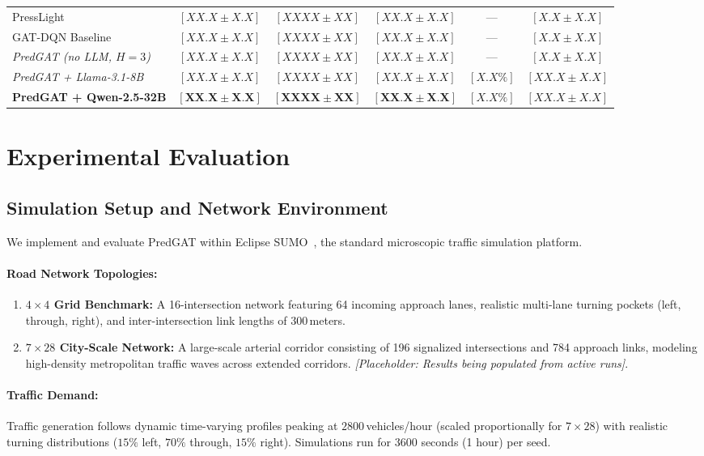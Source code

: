 \documentclass[11pt,a4paper,twocolumn]{article}
\begin{document}
\begin{table}[t]
\begin{tabular}{lccccc}
PressLight~\cite{wei2019presslight} & $[XX.X \pm X.X]$ & $[XXXX \pm XX]$ & $[XX.X \pm X.X]$ & --- & $[X.X \pm X.X]$ \\
GAT-DQN Baseline & $[XX.X \pm X.X]$ & $[XXXX \pm XX]$ & $[XX.X \pm X.X]$ & --- & $[X.X \pm X.X]$ \\
\midrule
\textit{PredGAT (no LLM, $H=3$)} & $[XX.X \pm X.X]$ & $[XXXX \pm XX]$ & $[XX.X \pm X.X]$ & --- & $[X.X \pm X.X]$ \\
\textit{PredGAT + Llama-3.1-8B} & $[XX.X \pm X.X]$ & $[XXXX \pm XX]$ & $[XX.X \pm X.X]$ & $[X.X\%]$ & $[XX.X \pm X.X]$ \\
\textbf{PredGAT + Qwen-2.5-32B} & $[\mathbf{XX.X \pm X.X}]$ & $[\mathbf{XXXX \pm XX}]$ & $[\mathbf{XX.X \pm X.X}]$ & $[X.X\%]$ & $[XX.X \pm X.X]$ \\
\bottomrule
\end{tabular}
\end{table}

\section{Experimental Evaluation}
\label{sec:experiments}

\subsection{Simulation Setup and Network Environment}
We implement and evaluate PredGAT within Eclipse SUMO~\cite{lopez2018microscopic}, the standard microscopic traffic simulation platform.
\paragraph{Road Network Topologies:} 
\begin{enumerate}
    \item \textbf{$4\times4$ Grid Benchmark:} A 16-intersection network featuring 64 incoming approach lanes, realistic multi-lane turning pockets (left, through, right), and inter-intersection link lengths of $300$\,meters.
    \item \textbf{$7\times28$ City-Scale Network:} A large-scale arterial corridor consisting of 196 signalized intersections and 784 approach links, modeling high-density metropolitan traffic waves across extended corridors. \textit{[Placeholder: Results being populated from active runs]}.
\end{enumerate}

\paragraph{Traffic Demand:} Traffic generation follows dynamic time-varying profiles peaking at $2800$\,vehicles/hour (scaled proportionally for $7\times28$) with realistic turning distributions ($15\%$ left, $70\%$ through, $15\%$ right). Simulations run for 3600 seconds (1 hour) per seed.
\end{document}
